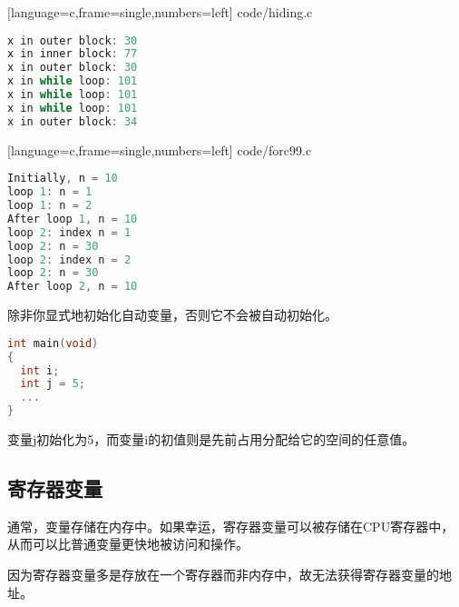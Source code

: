 \begin{frame}\ft{\subsecname}

[language=c,frame=single,numbers=left]
{code/hiding.c}
\end{frame}

\begin{frame}[fragile]\ft{\subsecname}
  \begin{lstlisting}[language=c,frame=single]
x in outer block: 30
x in inner block: 77
x in outer block: 30
x in while loop: 101
x in while loop: 101
x in while loop: 101
x in outer block: 34  
  \end{lstlisting}
\end{frame}

\begin{frame}\ft{\subsecname}

[language=c,frame=single,numbers=left]
{code/forc99.c}

\end{frame}

\begin{frame}[fragile]\ft{\subsecname}
  \begin{lstlisting}[language=c,frame=single]
Initially, n = 10
loop 1: n = 1
loop 1: n = 2
After loop 1, n = 10
loop 2: index n = 1
loop 2: n = 30
loop 2: index n = 2
loop 2: n = 30
After loop 2, n = 10
  \end{lstlisting}
\end{frame}

\begin{frame}[fragile]
除非你显式地初始化自动变量，否则它不会被自动初始化。
\begin{lstlisting}[language=c,frame=single]
int main(void)
{
  int i;
  int j = 5;
  ...
}  
\end{lstlisting}
变量{\tf j}初始化为5，而变量{\tf i}的初值则是先前占用分配给它的空间的任意值。
\end{frame}


\subsection{寄存器变量}
\begin{frame}[fragile]\ft{\subsecname}
通常，变量存储在内存中。如果幸运，寄存器变量可以被存储在CPU寄存器中，从而可以比普通变量更快地被访问和操作。
\vspace{0.1in}

因为寄存器变量多是存放在一个寄存器而非内存中，故\textcolor{acolor1}{无法获得寄存器变量的地址。} 

\end{frame}

